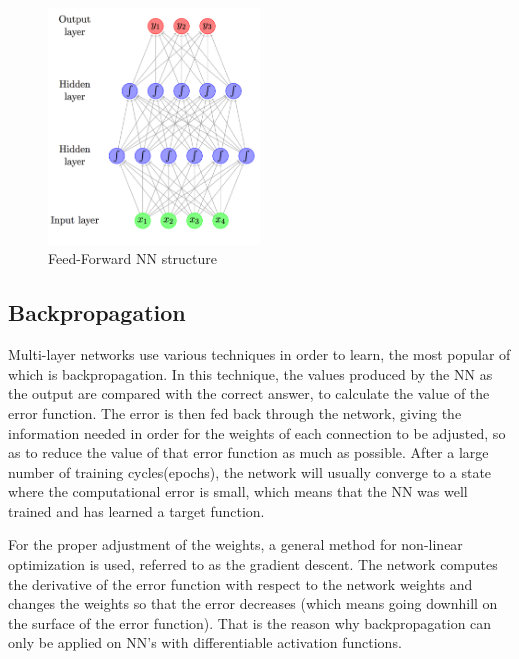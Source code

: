     \begin{figure}[h]
        \centering
        \includegraphics[width=0.50\textwidth]{media/Feed-forward-neural-network-with-two-hidden-layers.png}
        \caption{Feed-Forward NN structure}
        \label{fig:lstm}
    \end{figure}

    
    \subsection{Backpropagation}
    Multi-layer networks use various techniques in order to learn, the most popular of which is backpropagation. In this technique, the values produced by the NN as the output are compared with the correct answer, to calculate the value of the error function. The error is then fed back through the network, giving the information needed in order for the weights of each connection to be adjusted, so as to reduce the value of that error function as much as possible. After a large number of training cycles(epochs), the network will usually converge to a state where the computational error is small, which means that the NN was well trained and has learned a target function. 
    
    For the proper adjustment of the weights, a general method for non-linear optimization is used, referred to as the gradient descent. The network computes the derivative of the error function with respect to the network weights and changes the weights so that the error decreases (which means going downhill on the surface of the error function). That is the reason why backpropagation can only be applied on NN's with differentiable activation functions.

